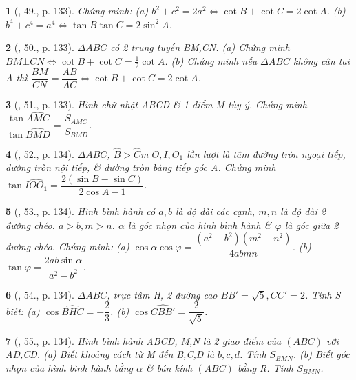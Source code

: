 \documentclass{article}
\newtheorem{baitoan}{}
\begin{document}
\begin{baitoan}[\cite{TLCT_hinh_hoc_10}, 49., p. 133]
	Chứng minh: (a) $b^2 + c^2 = 2a^2\Leftrightarrow\cot B + \cot C = 2\cot A$. (b) $b^4 + c^4 = a^4\Leftrightarrow\tan B\tan C = 2\sin^2A$.
\end{baitoan}

\begin{baitoan}[\cite{TLCT_hinh_hoc_10}, 50., p. 133]
	$\Delta ABC$ có 2 trung tuyến BM,CN. (a) Chứng minh $BM\bot CN\Leftrightarrow\cot B + \cot C = \frac{1}{2}\cot A$. (b) Chứng minh nếu $\Delta ABC$ không cân tại A thì $\dfrac{BM}{CN} = \dfrac{AB}{AC}\Leftrightarrow\cot B + \cot C = 2\cot A$.
\end{baitoan}

\begin{baitoan}[\cite{TLCT_hinh_hoc_10}, 51., p. 133]
	Hình chữ nhật ABCD \& 1 điểm M tùy ý. Chứng minh $\dfrac{\tan\widehat{AMC}}{\tan\widehat{BMD}} = \dfrac{S_{AMC}}{S_{BMD}}$.
\end{baitoan}

\begin{baitoan}[\cite{TLCT_hinh_hoc_10}, 52., p. 134]
	$\Delta ABC$, $\widehat{B} > \widehat{C}$m $O,I,O_1$ lần lượt là tâm đường tròn ngoại tiếp, đường tròn nội tiếp, \& đường tròn bàng tiếp góc A. Chứng minh $\tan\widehat{IOO_1} = \dfrac{2(\sin B - \sin C)}{2\cos A - 1}$.
\end{baitoan}

\begin{baitoan}[\cite{TLCT_hinh_hoc_10}, 53., p. 134]
	Hình bình hành có $a,b$ là độ dài các cạnh, $m,n$ là độ dài 2 đường chéo. $a > b,m > n$. $\alpha$ là góc nhọn của hình bình hành \& $\varphi$ là góc giữa 2 đường chéo. Chứng minh: (a) $\cos\alpha\cos\varphi = \dfrac{(a^2 - b^2)(m^2 - n^2)}{4abmn}$. (b) $\tan\varphi = \dfrac{2ab\sin\alpha}{a^2 - b^2}$.
\end{baitoan}

\begin{baitoan}[\cite{TLCT_hinh_hoc_10}, 54., p. 134]
	$\Delta ABC$, trực tâm H, 2 đường cao $BB' = \sqrt{5},CC' = 2$. Tính S biết: (a) $\cos\widehat{BHC} = -\dfrac{2}{3}$. (b) $\cos\widehat{CBB'} = \dfrac{2}{\sqrt{5}}$.
\end{baitoan}

\begin{baitoan}[\cite{TLCT_hinh_hoc_10}, 55., p. 134]
	Hình bình hành ABCD, M,N là 2 giao điểm của $(ABC)$ với AD,CD. (a) Biết khoảng cách từ M đến B,C,D là $b,c,d$. Tính $S_{BMN}$. (b) Biết góc nhọn của hình bình hành bằng $\alpha$ \& bán kính $(ABC)$ bằng R. Tính $S_{BMN}$.
\end{baitoan}
\end{document}
